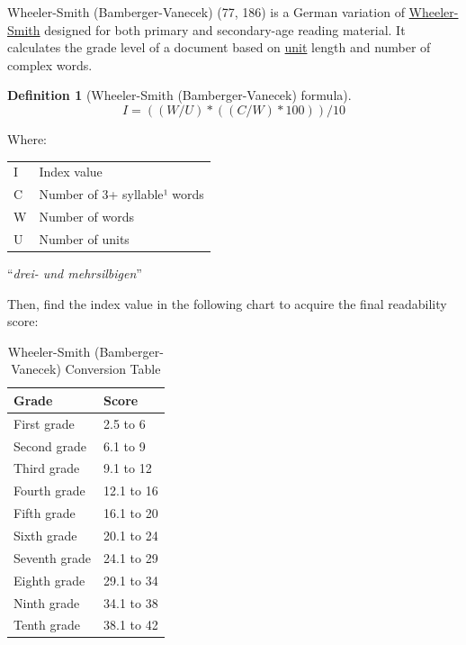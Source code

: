 \documentclass[
]{book}
\theoremstyle{definition}
\newtheorem{definition}{Definition}[chapter]
\theoremstyle{definition}
\theoremstyle{definition}
\theoremstyle{definition}
\theoremstyle{remark}
\begin{document}
Wheeler-Smith (Bamberger-Vanecek) (77, 186) is a German variation of \protect\hyperlink{wheeler-smith}{Wheeler-Smith} designed for both primary and secondary-age reading material. It calculates the grade level of a document based on \protect\hyperlink{glossary}{unit} length and number of complex words.

\begin{definition}[Wheeler-Smith (Bamberger-Vanecek) formula]
\protect\hypertarget{def:wheelersmithde}{}{\label{def:wheelersmithde} {} }\[
I = ((W/U)*((C/W)*100)) / 10
\]
\end{definition}

Where:

\begin{table}
\centering
\begin{threeparttable}
\begin{tabular}[t]{ll}
\toprule
I & Index value\\
C & Number of 3+ syllable¹ words\\
W & Number of words\\
U & Number of units\\
\bottomrule
\end{tabular}
\begin{tablenotes}
\item[1] “\textit{drei- und mehrsilbigen}”
\end{tablenotes}
\end{threeparttable}
\end{table}

Then, find the index value in the following chart to acquire the final readability score:

\begin{table}

\caption{\label{tab:unnamed-chunk-31}Wheeler-Smith (Bamberger-Vanecek) Conversion Table}
\centering
\begin{tabular}[t]{ll}
\toprule
Grade & Score\\
\midrule
First grade & 2.5 to 6\\
Second grade & 6.1 to 9\\
Third grade & 9.1 to 12\\
Fourth grade & 12.1 to 16\\
Fifth grade & 16.1 to 20\\
Sixth grade & 20.1 to 24\\
Seventh grade & 24.1 to 29\\
Eighth grade & 29.1 to 34\\
Ninth grade & 34.1 to 38\\
Tenth grade & 38.1 to 42\\
\bottomrule
\end{tabular}
\end{table}
\end{document}
